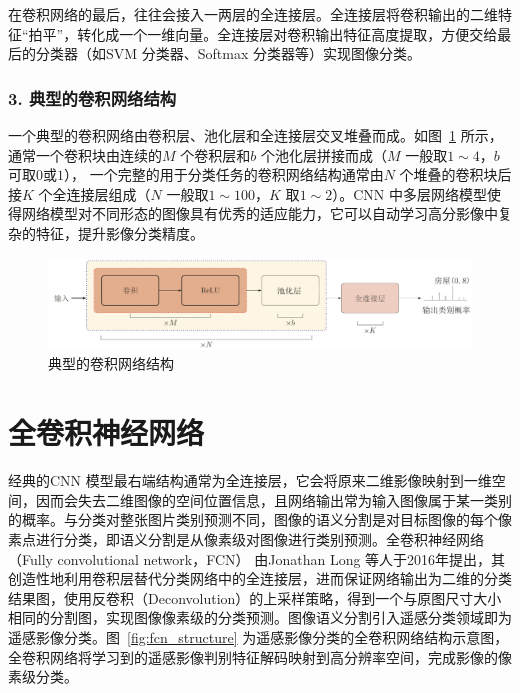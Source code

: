 在卷积网络的最后，往往会接入一两层的全连接层。全连接层将卷积输出的二维特征“拍平”，转化成一个一维向量。全连接层对卷积输出特征高度提取，方便交给最后的分类器（如SVM 分类器、Softmax 分类器等）实现图像分类。

\subsubsection*{3. 典型的卷积网络结构}
\label{subsec:chap02-2-1-3}
一个典型的卷积网络由卷积层、池化层和全连接层交叉堆叠而成。如图~\ref{fig:cnn_structure} 所示，通常一个卷积块由连续的$M$ 个卷积层和$b$ 个池化层拼接而成（$M$ 一般取$1\sim 4$，$b$ 可取$0$或$1$）， 一个完整的用于分类任务的卷积网络结构通常由$N$ 个堆叠的卷积块后接$K$ 个全连接层组成（$N$ 一般取$1\sim 100$，$K$ 取$1 \sim 2$）。CNN 中多层网络模型使得网络模型对不同形态的图像具有优秀的适应能力，它可以自动学习高分影像中复杂的特征，提升影像分类精度。

\begin{figure}[htb]
  \centering
  \includegraphics[width=1.0\textwidth]{figures/cnn_structure}
  \caption{典型的卷积网络结构}\label{fig:cnn_structure}
\end{figure}

\section{全卷积神经网络}
\label{ssec:chap02-2}
经典的CNN 模型最右端结构通常为全连接层，它会将原来二维影像映射到一维空间，因而会失去二维图像的空间位置信息，且网络输出常为输入图像属于某一类别的概率。与分类对整张图片类别预测不同，图像的语义分割是对目标图像的每个像素点进行分类，即语义分割是从像素级对图像进行类别预测。全卷积神经网络（Fully convolutional network，FCN）\cite{long2015fully} 由Jonathan Long 等人于2016年提出，其创造性地利用卷积层替代分类网络中的全连接层，进而保证网络输出为二维的分类结果图，使用反卷积（Deconvolution）的上采样策略，得到一个与原图尺寸大小相同的分割图，实现图像像素级的分类预测。图像语义分割引入遥感分类领域即为遥感影像分类。图~\ref{fig:fcn_structure} 为遥感影像分类的全卷积网络结构示意图，全卷积网络将学习到的遥感影像判别特征解码映射到高分辨率空间，完成影像的像素级分类。

